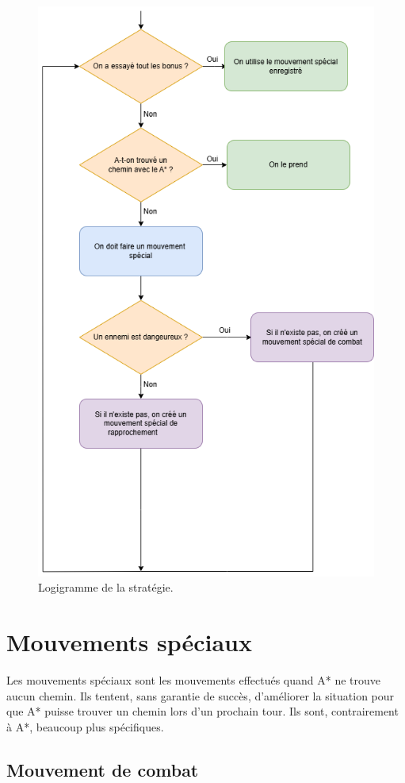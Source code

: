 \begin{figure}[!htpb]
    \centering
    \includegraphics[width=0.75\linewidth]{Figures/diagramme2.png}
    \caption[Logigramme de la stratégie.]{Logigramme de la stratégie.}
    \label{fig:logigramme}
\end{figure}

\newpage

\section{Mouvements spéciaux}

Les mouvements spéciaux sont les mouvements effectués quand A* ne trouve aucun chemin.
Ils tentent, sans garantie de succès, d'améliorer la situation pour que A* puisse trouver un chemin lors d'un prochain tour.
\newline
Ils sont, contrairement à A*, beaucoup plus spécifiques.

\subsection{Mouvement de combat}

